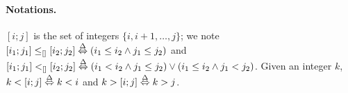 \paragraph{Notations.}
$[i;j]$ is the set of integers $\{ i, i+1, \dots, j \}$;
we note $[i_1;j_1] \leq_{[]} [i_2;j_2] \stackrel{\Delta}\Leftrightarrow (i_1\leq i_2\wedge j_1\leq j_2)$
and $[i_1;j_1] <_{[]} [i_2;j_2] \stackrel{\Delta}\Leftrightarrow 
(i_1<i_2 \wedge j_1\leq j_2) \vee (i_1\leq i_2\wedge j_1 < j_2)$.
Given an integer $k$, $k<[i;j] \stackrel{\Delta}\Leftrightarrow k <i$ and $k>[i;j]\stackrel{\Delta}\Leftrightarrow k > j$.

